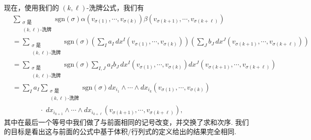 现在，使用我们的 $(k,\ell)$-洗牌公式，我们有
\begin{align*}
&\sum_{\substack{\sigma\text{ 是}\\ (k,\ell)\text{-洗牌}}}\mathrm{sgn}(\sigma)\alpha(v_{\sigma(1)},\cdots,v_{\sigma(k)})\beta(v_{\sigma(k+1)},\cdots,v_{\sigma(k+\ell)})\\
&=\sum_{\substack{\sigma\text{ 是}\\ (k,\ell)\text{-洗牌}}}\mathrm{sgn}(\sigma)
\left(\sum_{I}a_I\,dx^I(v_{\sigma(1)},\cdots,v_{\sigma(k)})\right)
\left(\sum_{J}b_J\,dx^J(v_{\sigma(k+1)},\cdots,v_{\sigma(k+\ell)})\right)\\
&=\sum_{\substack{\sigma\text{ 是}\\ (k,\ell)\text{-洗牌}}}\mathrm{sgn}(\sigma)
\sum_{I,J}a_Ib_J\,dx^I(v_{\sigma(1)},\cdots,v_{\sigma(k)})dx^J(v_{\sigma(k+1)},\cdots,v_{\sigma(k+\ell)})\\
&=\sum_{I}a_I\sum_{\substack{\sigma\text{ 是}\\ (k,\ell)\text{-洗牌}}}\mathrm{sgn}(\sigma)
dx_{i_1}\wedge\cdots\wedge dx_{i_k}(v_{\sigma(1)},\cdots,v_{\sigma(k)})\\
&\qquad\qquad\cdot\;dx_{i_{k+1}}\wedge\cdots\wedge dx_{i_{k+\ell}}(v_{\sigma(k+1)},\cdots,v_{\sigma(k+\ell)}),
\end{align*}
其中在最后一个等号中我们做了与前面相同的记号改变，并交换了求和次序. 我们的目标是看出这与前面的公式中基于体积/行列式的定义给出的结果完全相同.

